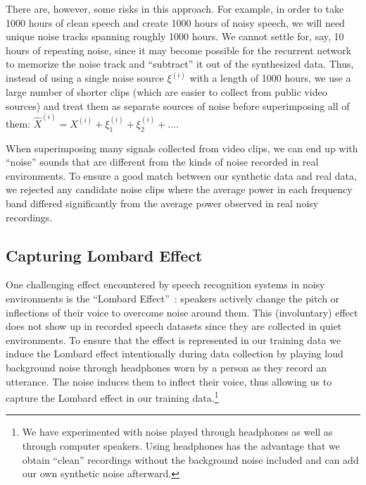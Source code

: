 There are, however, some risks in this approach. For example, in order to take
1000 hours of clean speech and create 1000 hours of noisy speech, we will need
unique noise tracks spanning roughly 1000 hours. We cannot settle for, say, 10
hours of repeating noise, since it may become possible for the recurrent
network to memorize the noise track and ``subtract'' it out of the synthesized
data. Thus, instead of using a single noise source $\xi^{(i)}$ with a length of
1000 hours, we use a large number of shorter clips (which are easier to collect
from public video sources) and treat them as separate sources of noise before
superimposing all of them: $\hat{X}^{(i)} = X^{(i)} + \xi_1^{(i)} +\xi_2^{(i)}
+ \ldots$.

When superimposing many signals collected from video clips, we can end up with
``noise'' sounds that are different from the kinds of noise recorded in real
environments. To ensure a good match between our synthetic data and real data,
we rejected any candidate noise clips where the average power in each frequency
band differed significantly from the average power observed in real noisy
recordings.

\subsection{Capturing Lombard Effect}
\label{sec:deepspeech:lombard}

One challenging effect encountered by speech recognition systems in noisy
environments is the ``Lombard Effect''~\cite{junqua1993lombard}: speakers
actively change the pitch or inflections of their voice to overcome noise
around them. This (involuntary) effect does not show up in recorded speech
datasets since they are collected in quiet environments. To ensure that the
effect is represented in our training data we induce the Lombard effect
intentionally during data collection by playing loud background noise through
headphones worn by a person as they record an utterance. The noise induces them
to inflect their voice, thus allowing us to capture the Lombard effect in our
training data.\footnote{We have experimented with noise played through
headphones as well as through computer speakers. Using headphones has the
advantage that we obtain ``clean'' recordings without the background noise
included and can add our own synthetic noise afterward.}

